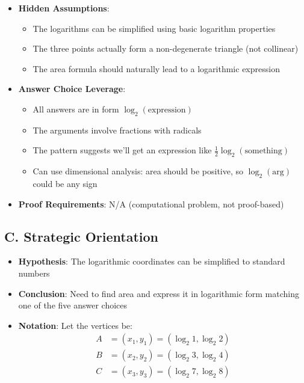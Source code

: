 \documentclass[12pt]{article}
\begin{document}
\begin{problemconfigbox}
\begin{itemize}[leftmargin=*]
    \item \textbf{Hidden Assumptions}: 
    \begin{itemize}
        \item The logarithms can be simplified using basic logarithm properties
        \item The three points actually form a non-degenerate triangle (not collinear)
        \item The area formula should naturally lead to a logarithmic expression
    \end{itemize}
    
    \item \textbf{Answer Choice Leverage}: 
    \begin{itemize}
        \item All answers are in form $\log_2(\text{expression})$
        \item The arguments involve fractions with radicals
        \item The pattern suggests we'll get an expression like $\frac{1}{2}\log_2(\text{something})$
        \item Can use dimensional analysis: area should be positive, so $\log_2(\text{arg})$ could be any sign
    \end{itemize}
    
    \item \textbf{Proof Requirements}: N/A (computational problem, not proof-based)
\end{itemize}

\subsection*{C. Strategic Orientation}
\begin{itemize}[leftmargin=*]
    \item \textbf{Hypothesis}: The logarithmic coordinates can be simplified to standard numbers
    
    \item \textbf{Conclusion}: Need to find area and express it in logarithmic form matching one of the five answer choices
    
    \item \textbf{Notation}: Let the vertices be:
    \begin{align*}
        A &= (x_1, y_1) = (\log_2 1, \log_2 2) \\
        B &= (x_2, y_2) = (\log_2 3, \log_2 4) \\
        C &= (x_3, y_3) = (\log_2 7, \log_2 8)
    \end{align*}
    

\end{itemize}
\end{problemconfigbox}
\end{document}
